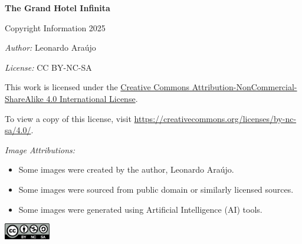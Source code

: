 \thispagestyle{empty} %

\vspace*{\fill} %

\begin{center}
    \textbf{\huge The Grand Hotel Infinita} %

    \large Copyright Information \textcopyright{} 2025 %
\end{center}

\vspace{1cm}

\begin{flushleft}
    \emph{Author:} Leonardo Araújo
\end{flushleft}

\vspace{0.5cm}

\begin{flushleft}
    \emph{License:} CC BY-NC-SA


    This work is licensed under the \href{https://creativecommons.org/licenses/by-nc-sa/4.0/}{Creative Commons Attribution-NonCommercial-ShareAlike 4.0 International License}.

    To view a copy of this license, visit \url{https://creativecommons.org/licenses/by-nc-sa/4.0/}.
\end{flushleft}

\vspace{0.5cm}

\begin{flushleft}
    \emph{Image Attributions:}

    \begin{itemize}
        \item Some images were created by the author, Leonardo Araújo.
        \item Some images were sourced from public domain or similarly licensed sources.
        \item Some images were generated using Artificial Intelligence (AI) tools.
    \end{itemize}
\end{flushleft}

\vspace*{\fill} %
\begin{center}
\includegraphics[width=2cm]{cc-by-nc-sa.pdf}
\end{center}

\newpage 
